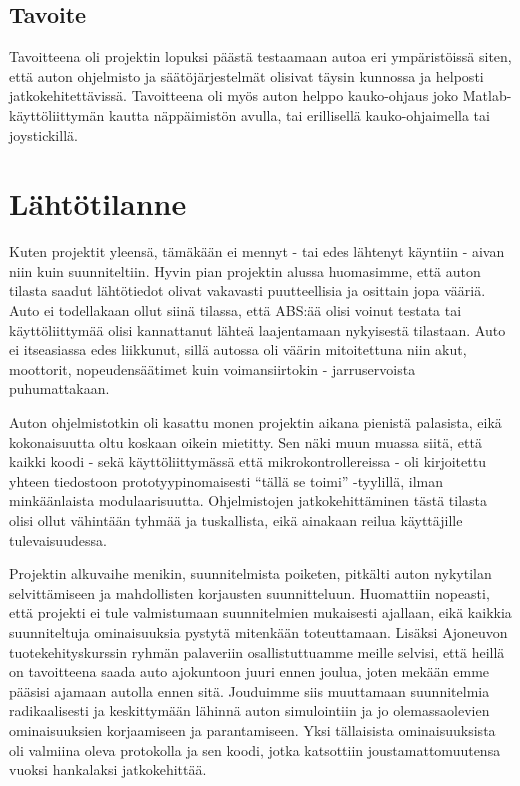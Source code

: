 \documentclass{article}
\begin{document}
\subsection{Tavoite}
Tavoitteena oli projektin lopuksi päästä testaamaan autoa eri ympäristöissä siten, että auton ohjelmisto ja säätöjärjestelmät olisivat täysin kunnossa ja helposti jatkokehitettävissä. Tavoitteena oli myös auton helppo kauko-ohjaus joko Matlab-käyttöliittymän kautta näppäimistön avulla, tai erillisellä kauko-ohjaimella tai joystickillä.

\section{Lähtötilanne}
Kuten projektit yleensä, tämäkään ei mennyt - tai edes lähtenyt käyntiin - aivan niin kuin suunniteltiin. Hyvin pian projektin alussa huomasimme, että auton tilasta saadut lähtötiedot olivat vakavasti puutteellisia ja osittain jopa vääriä. Auto ei todellakaan ollut siinä tilassa, että ABS:ää olisi voinut testata tai käyttöliittymää olisi kannattanut lähteä laajentamaan nykyisestä tilastaan. Auto ei itseasiassa edes liikkunut, sillä autossa oli väärin mitoitettuna niin akut, moottorit, nopeudensäätimet kuin voimansiirtokin - jarruservoista puhumattakaan.

Auton ohjelmistotkin oli kasattu monen projektin aikana pienistä palasista, eikä kokonaisuutta oltu koskaan oikein mietitty. Sen näki muun muassa siitä, että kaikki koodi - sekä käyttöliittymässä että mikrokontrollereissa - oli kirjoitettu yhteen tiedostoon prototyypinomaisesti ``tällä se toimi'' -tyylillä, ilman minkäänlaista modulaarisuutta. Ohjelmistojen jatkokehittäminen tästä tilasta olisi ollut vähintään tyhmää ja tuskallista, eikä ainakaan reilua käyttäjille tulevaisuudessa.

Projektin alkuvaihe menikin, suunnitelmista poiketen, pitkälti auton nykytilan selvittämiseen ja mahdollisten korjausten suunnitteluun. Huomattiin nopeasti, että projekti ei tule valmistumaan suunnitelmien mukaisesti ajallaan, eikä kaikkia suunniteltuja ominaisuuksia pystytä mitenkään toteuttamaan. Lisäksi Ajoneuvon tuotekehityskurssin ryhmän palaveriin osallistuttuamme meille selvisi, että heillä on tavoitteena saada auto ajokuntoon juuri ennen joulua, joten mekään emme pääsisi ajamaan autolla ennen sitä. Jouduimme siis muuttamaan suunnitelmia radikaalisesti ja keskittymään lähinnä auton simulointiin ja jo olemassaolevien ominaisuuksien korjaamiseen ja parantamiseen. Yksi tällaisista ominaisuuksista oli valmiina oleva protokolla ja sen koodi, jotka katsottiin joustamattomuutensa vuoksi hankalaksi jatkokehittää.
\end{document}
